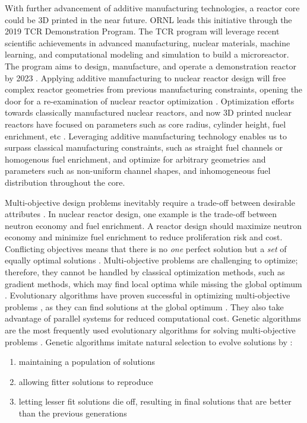 With further advancement of additive manufacturing technologies, a reactor 
core could be 3D printed in the near future. 
\gls{ORNL} leads this initiative through the 2019 \gls{TCR} Demonstration 
Program. 
The \gls{TCR} program will leverage recent scientific achievements in advanced 
manufacturing, nuclear materials, machine learning, and computational modeling 
and simulation to build a microreactor. 
The program aims to design, manufacture, and operate a demonstration reactor 
by 2023 \cite{terrani_transformational_2019}. 
Applying additive manufacturing to nuclear reactor design will free complex 
reactor geometries from previous manufacturing constraints,
opening the door for a re-examination of nuclear reactor optimization 
\cite{sobes_artificial_2020}. 
Optimization efforts towards classically manufactured nuclear reactors, and now
3D printed nuclear reactors have focused on parameters such as core radius, 
cylinder height, fuel enrichment, etc 
\cite{sobes_artificial_2020,sacco_two_2006,kumar_new_2015,pereira_parallel_2008}. 
Leveraging additive manufacturing technology enables us to surpass classical 
manufacturing constraints, such as straight fuel channels or homogenous fuel 
enrichment, and optimize for arbitrary geometries and parameters 
such as non-uniform channel shapes, and inhomogeneous fuel distribution throughout 
the core. 

Multi-objective design problems inevitably require a trade-off between 
desirable attributes \cite{byrne_evolving_2014,simon_sciences_2019}. 
In nuclear reactor design, one example is the trade-off between neutron economy 
and fuel enrichment.
A reactor design should maximize neutron economy and minimize fuel enrichment 
to reduce proliferation risk and cost. 
Conflicting objectives means that there is no \textit{one} perfect solution but 
a \textit{set} of equally optimal solutions \cite{byrne_evolving_2014}.
Multi-objective problems are challenging to optimize; therefore, they cannot be 
handled by classical optimization methods, such as gradient methods, which may 
find local optima while missing the global optimum \cite{renner_genetic_2003}. 
Evolutionary algorithms have proven successful in optimizing multi-objective problems 
\cite{krish_practical_2011}, as they can find solutions at the global 
optimum \cite{renner_genetic_2003}.
They also take advantage of parallel systems for reduced computational cost.
Genetic algorithms are the most frequently used evolutionary algorithms for 
solving multi-objective problems \cite{byrne_evolving_2014, krish_practical_2011}.
Genetic algorithms imitate natural selection to evolve solutions by 
\cite{renner_genetic_2003}: 
\begin{enumerate}
    \item maintaining a population of solutions
    \item allowing fitter solutions to reproduce
    \item letting lesser fit solutions die off, resulting in final solutions that are 
    better than the previous generations
\end{enumerate} 

